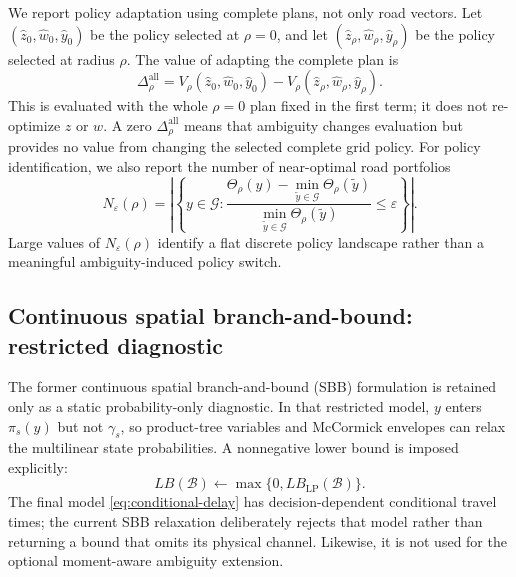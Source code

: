 We report policy adaptation using complete plans, not only road vectors.
Let \((\widehat z_0,\widehat w_0,\widehat y_0)\) be the policy selected at
\(\rho=0\), and let
\((\widehat z_\rho,\widehat w_\rho,\widehat y_\rho)\) be the policy selected
at radius \(\rho\). The value of adapting the complete plan is
\begin{equation}
 \Delta_\rho^{\mathrm{all}}
 =
 V_\rho(\widehat z_0,\widehat w_0,\widehat y_0)
 -
 V_\rho(\widehat z_\rho,\widehat w_\rho,\widehat y_\rho).
\label{eq:complete-adaptation}
\end{equation}
This is evaluated with the whole \(\rho=0\) plan fixed in the first term; it
does not re-optimize \(z\) or \(w\). A zero
\(\Delta_\rho^{\mathrm{all}}\) means that ambiguity changes evaluation but
provides no value from changing the selected complete grid policy. For
policy identification, we also report the number of near-optimal road
portfolios
\begin{equation}
 N_\varepsilon(\rho)
 =
 \left\lvert
   \left\{y\in\mathcal G:
   \frac{\Theta_\rho(y)-\min_{\tilde y\in\mathcal G}
   \Theta_\rho(\tilde y)}
   {\min_{\tilde y\in\mathcal G}\Theta_\rho(\tilde y)}
   \leq\varepsilon
   \right\}
 \right\rvert .
\label{eq:near-optimal-count}
\end{equation}
Large values of \(N_\varepsilon(\rho)\) identify a flat discrete policy
landscape rather than a meaningful ambiguity-induced policy switch.

\subsection{Continuous spatial branch-and-bound: restricted diagnostic}
\label{sec:sbb}

The former continuous spatial branch-and-bound (SBB) formulation is retained
only as a static probability-only diagnostic. In that restricted model,
\(y\) enters \(\pi_s(y)\) but not \(\gamma_s\), so product-tree variables and
McCormick envelopes can relax the multilinear state probabilities. A
nonnegative lower bound is imposed explicitly:
\begin{equation}
 LB(\mathcal B)\leftarrow\max\{0,LB_{\mathrm{LP}}(\mathcal B)\}.
\label{eq:valid-lb}
\end{equation}
The final model \eqref{eq:conditional-delay} has decision-dependent
conditional travel times; the current SBB relaxation deliberately rejects
that model rather than returning a bound that omits its physical channel.
Likewise, it is not used for the optional moment-aware ambiguity extension.


